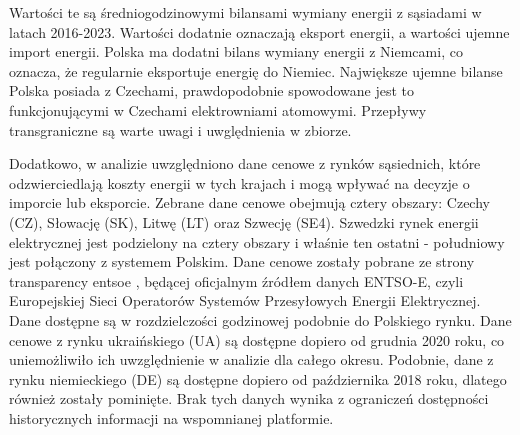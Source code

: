 \begin{table}[H]
    \centering
    \caption{Średni bilans wymiany energii z sąsiadami w latach 2016-2023. Opracowanie własne na podstawie danych PSE.}
    \label{tab:energy-trade-balance}
\end{table}

Wartości te są średniogodzinowymi bilansami wymiany energii z sąsiadami w latach 2016-2023. Wartości dodatnie oznaczają eksport energii, a wartości ujemne import energii. Polska ma dodatni bilans wymiany energii z Niemcami, co oznacza, że regularnie eksportuje energię do Niemiec. Największe ujemne bilanse Polska posiada z Czechami, prawdopodobnie spowodowane jest to funkcjonującymi w Czechami elektrowniami atomowymi. Przepływy transgraniczne są warte uwagi i uwględnienia w zbiorze.

Dodatkowo, w analizie uwzględniono dane cenowe z rynków sąsiednich, które odzwierciedlają koszty energii w tych krajach i mogą wpływać na decyzje o imporcie lub eksporcie. Zebrane dane cenowe obejmują cztery obszary: Czechy (CZ), Słowację (SK), Litwę (LT) oraz Szwecję (SE4). Szwedzki rynek energii elektrycznej jest podzielony na cztery obszary i właśnie ten ostatni - południowy jest połączony z systemem Polskim. Dane cenowe zostały pobrane ze strony transparency entsoe \cite{transparency_entso}, będącej oficjalnym źródłem danych ENTSO-E, czyli Europejskiej Sieci Operatorów Systemów Przesyłowych Energii Elektrycznej. Dane dostępne są w rozdzielczości godzinowej podobnie do Polskiego rynku. \newline Dane cenowe z rynku ukraińskiego (UA) są dostępne dopiero od grudnia 2020 roku, co uniemożliwiło ich uwzględnienie w analizie dla całego okresu. Podobnie, dane z rynku niemieckiego (DE) są dostępne dopiero od października 2018 roku, dlatego również zostały pominięte. Brak tych danych wynika z ograniczeń dostępności historycznych informacji na wspomnianej platformie.

